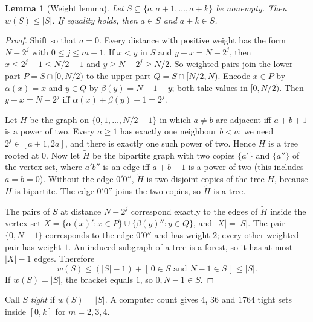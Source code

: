 \documentclass[11pt]{article}
\newtheorem{lemma}[theorem]{Lemma}
\theoremstyle{remark}
\begin{document}
\begin{lemma}[Weight lemma]\label{lem:weight}
Let $S\subseteq\{a,a+1,\dots,a+k\}$ be nonempty. Then $w(S)\le |S|$. If equality holds, then $a\in S$ and $a+k\in S$.
\end{lemma}
\begin{proof}
Shift so that $a=0$. Every distance with positive weight has the form $N-2^j$ with $0\le j\le m-1$. If $x<y$ in $S$ and $y-x=N-2^j$, then $x\le 2^j-1\le N/2-1$ and $y\ge N-2^j\ge N/2$. So weighted pairs join the lower part $P=S\cap[0,N/2)$ to the upper part $Q=S\cap[N/2,N)$. Encode $x\in P$ by $\alpha(x)=x$ and $y\in Q$ by $\beta(y)=N-1-y$; both take values in $[0,N/2)$. Then $y-x=N-2^j$ iff $\alpha(x)+\beta(y)+1=2^j$.

Let $H$ be the graph on $\{0,1,\dots,N/2-1\}$ in which $a\ne b$ are adjacent iff $a+b+1$ is a power of two. Every $a\ge1$ has exactly one neighbour $b<a$: we need $2^j\in[a+1,2a]$, and there is exactly one such power of two. Hence $H$ is a tree rooted at $0$. Now let $\widetilde H$ be the bipartite graph with two copies $\{a'\}$ and $\{a''\}$ of the vertex set, where $a'b''$ is an edge iff $a+b+1$ is a power of two (this includes $a=b=0$). Without the edge $0'0''$, $\widetilde H$ is two disjoint copies of the tree $H$, because $H$ is bipartite. The edge $0'0''$ joins the two copies, so $\widetilde H$ is a tree.

The pairs of $S$ at distance $N-2^j$ correspond exactly to the edges of $\widetilde H$ inside the vertex set $X=\{\alpha(x)':x\in P\}\cup\{\beta(y)'':y\in Q\}$, and $|X|=|S|$. The pair $\{0,N-1\}$ corresponds to the edge $0'0''$ and has weight $2$; every other weighted pair has weight $1$. An induced subgraph of a tree is a forest, so it has at most $|X|-1$ edges. Therefore
\[w(S)\le (|S|-1)+[\,0\in S\text{ and }N-1\in S\,]\le |S|.\]
If $w(S)=|S|$, the bracket equals $1$, so $0,N-1\in S$.
\end{proof}

Call $S$ \emph{tight} if $w(S)=|S|$. A computer count gives $4$, $36$ and $1764$ tight sets inside $[0,k]$ for $m=2,3,4$.
\end{document}
